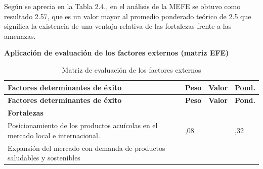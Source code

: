 \documentclass[
  stu,
  floatsintext,
  longtable,
  a4paper,
  nolmodern,
  notxfonts,
  notimes,
  colorlinks=true,linkcolor=blue,citecolor=blue,urlcolor=blue]{apa7}
\begin{document}
Según se aprecia en la Tabla 2.4., en el análisis de la MEFE se obtuvo
como resultado 2.57, que es un valor mayor al promedio ponderado teórico
de 2.5 que significa la existencia de una ventaja relativa de las
fortalezas frente a las amenazas.

\textbf{Aplicación de evaluación de los factores externos (matriz EFE)}

\begin{longtable}[]{@{}
  >{\raggedright\arraybackslash}p{}
  >{\centering\arraybackslash}p{}
  >{\centering\arraybackslash}p{}
  >{\centering\arraybackslash}p{}@{}}
\caption{Matriz de evaluación de los factores externos}\tabularnewline
\toprule\noalign{}
\begin{minipage}[b]{\linewidth}\raggedright
\textbf{Factores determinantes de éxito}
\end{minipage} & \begin{minipage}[b]{\linewidth}\centering
\textbf{Peso}
\end{minipage} & \begin{minipage}[b]{\linewidth}\centering
\textbf{Valor}
\end{minipage} & \begin{minipage}[b]{\linewidth}\centering
\textbf{Pond.}
\end{minipage} \\
\midrule\noalign{}
\endfirsthead
\toprule\noalign{}
\begin{minipage}[b]{\linewidth}\raggedright
\textbf{Factores determinantes de éxito}
\end{minipage} & \begin{minipage}[b]{\linewidth}\centering
\textbf{Peso}
\end{minipage} & \begin{minipage}[b]{\linewidth}\centering
\textbf{Valor}
\end{minipage} & \begin{minipage}[b]{\linewidth}\centering
\textbf{Pond.}
\end{minipage} \\
\midrule\noalign{}
\endhead
\bottomrule\noalign{}
\endlastfoot
\textbf{Fortalezas} & & & \\
Posicionamiento de los productos acuícolas en el mercado local e
internacional. & 0,08 & 4 & 0,32 \\
Expansión del mercado con demanda de productos saludables y sostenibles

\end{longtable}
\end{document}
